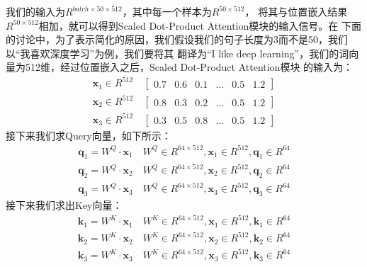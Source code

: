 \documentclass{article}
\begin{document}
我们的输入为$R^{batch \times 50 \times 512}$，其中每一个样本为$R^{50 \times 512}$，
将其与位置嵌入结果$R^{50 \times 512}$相加，就可以得到Scaled Dot-Product Attention模块的输入信号。在
下面的讨论中，为了表示简化的原因，我们假设我们的句子长度为3而不是50，我们以“我喜欢深度学习”为例，我们要将其
翻译为“I like deep learning”，我们的词向量为512维，经过位置嵌入之后，Scaled Dot-Product Attention模块
的输入为：
\begin{equation}
\begin{aligned}
\boldsymbol{x}_{1} \in R^{512} \quad
\begin{bmatrix}
0.7 & 0.6 & 0.1 & ... & 0.5 & 1.2 
\end{bmatrix} \\
\boldsymbol{x}_{2} \in R^{512} \quad
\begin{bmatrix}
0.8 & 0.3 & 0.2 & ... & 0.5 & 1.2 
\end{bmatrix} \\
\boldsymbol{x}_{3} \in R^{512} \quad
\begin{bmatrix}
0.3 & 0.5 & 0.8 & ... & 0.5 & 1.2 
\end{bmatrix} 
\end{aligned}
\label{e000105}
\end{equation}
接下来我们求Query向量，如下所示：
\begin{equation}
\begin{aligned}
\boldsymbol{q}_{1} = W^{Q} \cdot \boldsymbol{x}_1 \quad W^{Q} \in R^{64 \times 512}, 
\boldsymbol{x}_1 \in R^{512}, \boldsymbol{q}_1 \in R^{64} \\
\boldsymbol{q}_{2} = W^{Q} \cdot \boldsymbol{x}_2 \quad W^{Q} \in R^{64 \times 512}, 
\boldsymbol{x}_2 \in R^{512}, \boldsymbol{q}_2 \in R^{64} \\
\boldsymbol{q}_{3} = W^{Q} \cdot \boldsymbol{x}_3 \quad W^{Q} \in R^{64 \times 512}, 
\boldsymbol{x}_3 \in R^{512}, \boldsymbol{q}_3 \in R^{64} 
\end{aligned}
\label{e000106}
\end{equation}
接下来我们求出Key向量：
\begin{equation}
\begin{aligned}
\boldsymbol{k}_{1} = W^{K} \cdot \boldsymbol{x}_1 \quad W^{K} \in R^{64 \times 512}, 
\boldsymbol{x}_1 \in R^{512}, \boldsymbol{k}_1 \in R^{64} \\
\boldsymbol{k}_{2} = W^{K} \cdot \boldsymbol{x}_2 \quad W^{K} \in R^{64 \times 512}, 
\boldsymbol{x}_2 \in R^{512}, \boldsymbol{k}_2 \in R^{64} \\
\boldsymbol{k}_{3} = W^{K} \cdot \boldsymbol{x}_3 \quad W^{K} \in R^{64 \times 512}, 
\boldsymbol{x}_3 \in R^{512}, \boldsymbol{k}_3 \in R^{64} 
\end{aligned}
\label{e000107}
\end{equation}
\end{document}
